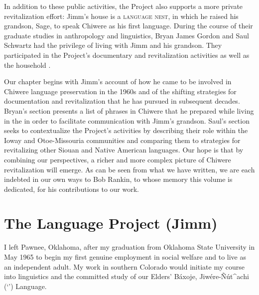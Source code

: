 \documentclass[output=paper]{LSP/langsci}
\begin{document}
In addition to these public activities, the Project also supports a more private revitalization effort: Jimm's house is a \textsc{language nest}, in which he raised his grandson, Sage, to speak Chiwere as his first language. During the course of their graduate studies in anthropology and linguistics, Bryan James Gordon and Saul Schwartz had the privilege of living with Jimm and his grandson. They participated in the Project's documentary and revitalization activities as well as the household .

Our chapter begins with Jimm's account of how he came to be involved in Chiwere language preservation in the 1960s and of the shifting strategies for documentation and revitalization that he has pursued in subsequent decades. Bryan's section presents a list of phrases in Chiwere that he prepared while living in the  in order to facilitate communication with Jimm's grandson. Saul's section seeks to contextualize the Project's activities by describing their role within the Ioway and Otoe-Missouria communities and comparing them to strategies for revitalizing other Siouan and Native American languages. Our hope is that by combining our perspectives, a richer and more complex picture of Chiwere revitalization will emerge. As can be seen from what we have written, we are each indebted in our own ways to Bob Rankin, to whose memory this volume is dedicated, for his contributions to our work.

\section{The  Language Project (Jimm)}
I left Pawnee, Oklahoma, after my graduation from Oklahoma State University in May 1965 to begin my first genuine employment in social welfare and to live as an independent adult. My work in southern Colorado would initiate my course into linguistics and the committed study of our Elders' Báxoje, Jiwére-\~Nút\^{ }achi (`') Language.
\end{document}
